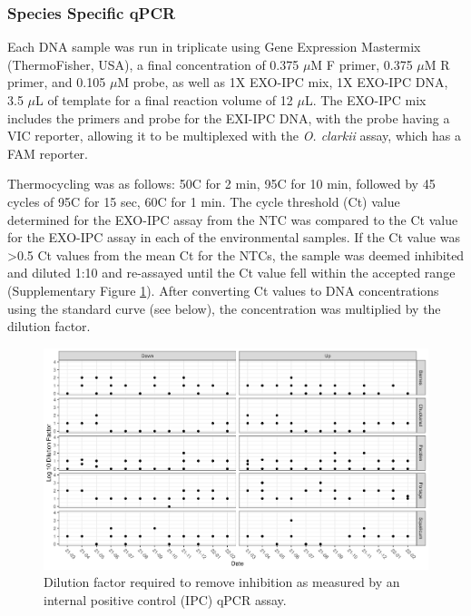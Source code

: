 \documentclass[
]{article}
\begin{document}
\hypertarget{species-specific-qpcr}{%
\subsubsection{Species Specific qPCR}\label{species-specific-qpcr}}

Each DNA sample was run in triplicate using Gene Expression Mastermix
(ThermoFisher, USA), a final concentration of 0.375 \(\mu\)M F primer,
0.375 \(\mu\)M R primer, and 0.105 \(\mu\)M probe, as well as 1X EXO-IPC
mix, 1X EXO-IPC DNA, 3.5 \(\mu\)L of template for a final reaction
volume of 12 \(\mu\)L. The EXO-IPC mix includes the primers and probe
for the EXI-IPC DNA, with the probe having a VIC reporter, allowing it
to be multiplexed with the \emph{O. clarkii} assay, which has a FAM
reporter.

Thermocycling was as follows: 50\degree C for 2 min, 95\degree C for 10
min, followed by 45 cycles of 95\degree C for 15 sec, 60\degree C for 1
min. The cycle threshold (Ct) value determined for the EXO-IPC assay
from the NTC was compared to the Ct value for the EXO-IPC assay in each
of the environmental samples. If the Ct value was \textgreater0.5 Ct
values from the mean Ct for the NTCs, the sample was deemed inhibited
and diluted 1:10 and re-assayed until the Ct value fell within the
accepted range (Supplementary Figure \ref{fig:inhib}). After converting
Ct values to DNA concentrations using the standard curve (see below),
the concentration was multiplied by the dilution factor.

\begin{figure}
\centering
\includegraphics{../Output/SupplementalFigures/inhibition_dilution_factors.png}
\caption{Dilution factor required to remove inhibition as measured by an
internal positive control (IPC) qPCR assay.\label{fig:inhib}}
\end{figure}
\end{document}
